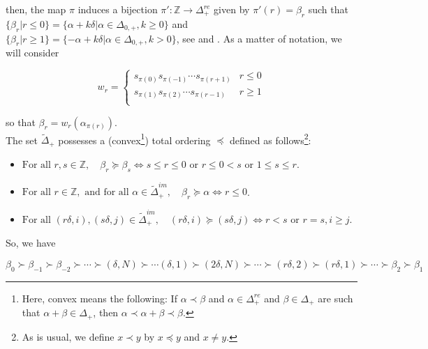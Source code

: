 \documentclass[12pt]{amsart}
\numberwithin{equation}{section}
\newcommand{\Z}{\ensuremath{\mathbb{Z}}}
\newcommand{\mb}[1]{\mathbb{#1}}
\begin{document}
then, the map $\pi$ induces a bijection $\pi' : \Z \to \Delta_{+}^{re}$ given by $\pi'(r) = \beta_r$ such that $\{\beta_r | r\leq 0\} = \{ \alpha + k\delta | \alpha \in \Delta_{0,+}, k\geq 0 \}$ and $\{\beta_r | r\geq 1\} = \{ -\alpha + k\delta | \alpha \in \Delta_{0,+}, k > 0 \}$, see \cite{B02} and \cite{P}. As a matter of notation, we will consider 

$$ w_r = \begin{cases}
    s_{\pi(0)}s_{\pi(-1)} \cdots s_{\pi(r+1)} & r\leq 0 \\
    s_{\pi(1)}s_{\pi(2)} \cdots s_{\pi(r-1)} & r \geq 1 \\
\end{cases}  $$ 

so that $\beta_r = w_r(\alpha_{\pi(r)})$.\\

The set $\tilde{\Delta}_+$ possesses a (convex\footnote{Here, convex means the following: If $\alpha \prec \beta$ and $\alpha \in \Delta_{+}^{re}$ and $\beta\in \Delta_{+}$ are such that $\alpha + \beta \in \Delta_{+}$, then $\alpha \prec \alpha + \beta \prec \beta$.}) total ordering $\preceq$ defined as follows\footnote{As is usual, we define $x\prec y$ by $x\preceq y$ and $x \neq y$.}: 

\begin{itemize}

\item $ \text{For all } r,s\in \mb{Z}, \quad  \beta_r   \succeq \beta_s  \Leftrightarrow s\leq r\leq 0 \text{ or } r\leq 0 < s \text{ or } 1\leq s \leq r$.

\item $ \text{For all } r\in \mb{Z}, \text{ and for all } \alpha \in \tilde{\Delta}_+^{im}, \quad \beta_r \succeq \alpha \Leftrightarrow r\leq 0 $.

\item $ \text{For all } (r\delta,i), (s\delta,j) \in \tilde{\Delta}_+^{im}, \quad (r\delta,i) \succeq (s\delta,j) \Leftrightarrow r < s \text{ or } r=s, i\geq j $.

\end{itemize}

So, we have

$$ \beta_{0} \succ \beta_{-1} \succ \beta_{-2} \succ \cdots \succ (\delta,N) \succ \cdots (\delta, 1) \succ (2\delta,N) \succ \cdots \succ (r\delta,2) \succ (r\delta, 1) \succ \cdots \succ \beta_2 \succ \beta_1  $$

\vspace{0.3cm} 
\end{document}
